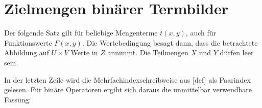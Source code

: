 \clearpage
\section{Zielmengen binärer Termbilder}

Der folgende Satz gilt für beliebige Mengenterme \(t(x,y)\), auch für
Funktionswerte \(F(x,y)\). Die Wertebedingung besagt dann, dass die
betrachtete Abbildung auf \(U\times V\) Werte in \(Z\) annimmt.
Die Teilmengen \(X\) und \(Y\) dürfen leer sein.

\begin{tabproofwide}
\end{tabproofwide}

In der letzten Zeile wird die Mehrfachindexschreibweise aus
[def] als Paarindex gelesen.
Für binäre Operatoren ergibt sich daraus die unmittelbar verwendbare Fassung:

